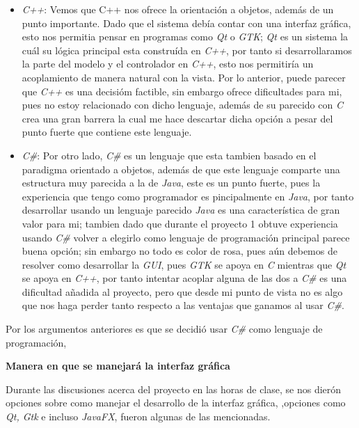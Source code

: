 \documentclass[10pt,letterpaper]{report}
\begin{document}
    \begin{itemize}
        \item [-] \textit{C++}: Vemos que C++ nos ofrece la orientación a objetos, además de un punto importante. Dado que el sistema debía contar con una interfaz gráfica, esto nos permitia pensar en programas como \textit{Qt} o \textit{GTK}; \textit{Qt} es un sistema la cuál su lógica principal esta construída en \textit{C++}, por tanto si desarrollaramos la parte del modelo y el controlador en \textit{C++}, esto nos permitiría un acoplamiento de manera natural con la vista. Por lo anterior, puede parecer que \textit{C++} es una decisióm factible, sin embargo ofrece dificultades para mi, pues no estoy relacionado con dicho lenguaje, además de su parecido con \textit{C} crea una gran barrera la cual me hace descartar dicha opción a pesar del punto fuerte que contiene este lenguaje.
         \item [-] \textit{C\#}: Por otro lado, \textit{C\#} es un lenguaje que esta tambien basado en el paradigma orientado a objetos, además de que este lenguaje comparte una estructura muy parecida a la de \textit{Java}, este es un punto fuerte, pues la experiencia que tengo como programador es pincipalmente en \textit{Java}, por tanto desarrollar usando un lenguaje parecido \textit{Java} es una característica de gran valor para mi; tambien dado que durante el proyecto 1 obtuve experiencia usando \textit{C\#} volver a elegirlo como lenguaje de programación principal parece buena opción; sin embargo no todo es color de rosa, pues aún debemos de resolver como desarrollar la \textit{GUI}, pues \textit{GTK} se apoya en \textit{C} mientras que \textit{Qt} se apoya en \textit{C++}, por tanto intentar acoplar alguna de las dos a \textit{C\#} es una dificultad añadida al proyecto, pero que desde mi punto de vista no es algo que nos haga perder tanto respecto a las ventajas que ganamos al usar \textit{C\#}.
    \end{itemize}

    \noindent Por los argumentos anteriores es que se decidió usar \textit{C\#} como lenguaje de programación,

    \vspace{0.5cm}

    \noindent \textbf{Manera en que se manejará la interfaz gráfica}

    \noindent Durante las discusiones acerca del proyecto en las horas de clase, se nos dierón opciones sobre como manejar el desarrollo de la interfaz gráfica, ,opciones como \textit{Qt, Gtk} e incluso \textit{JavaFX}, fueron algunas de las mencionadas. 
\end{document}
